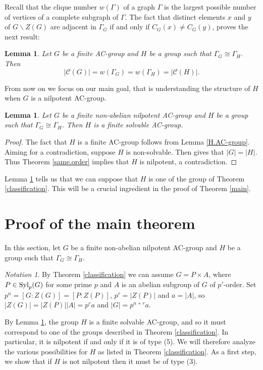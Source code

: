 \documentclass[12pt]{amsart}
\theoremstyle{definition}
\theoremstyle{remark}
\theoremstyle{plain}
\theoremstyle{plain}
\theoremstyle{plain}
\theoremstyle{plain}
\newtheorem{lemma}[definition]{Lemma}
\theoremstyle{plain}
\theoremstyle{remark}
\theoremstyle{remark}
\newtheorem{notation}[definition]{Notation}
\theoremstyle{definition}
\newcommand{\Syl}{\mathrm{Syl}}
\def \Syl {\hbox {\rm Syl}}
\begin{document}
Recall that the clique number $w(\Gamma)$ of a graph $\Gamma$ is the largest possible number of vertices of a complete subgraph of $\Gamma$. The fact that distinct elements $x$ and $y$ of $G \backslash Z(G)$ are adjacent in $\Gamma_G$ if and only if $C_G(x) \neq C_G(y)$, proves the next result:


\begin{lemma} Let $G$ be a finite AC-group and $H$ be a group such that $\Gamma_G \cong \Gamma_H$. Then
\[ |\mathcal{C}(G)| = w(\Gamma_G)=w(\Gamma_H)=|\mathcal{C}(H)|.\]
\end{lemma}

From now on we focus on our main goal, that is understanding the structure of $H$ when $G$ is a nilpotent AC-group.

\begin{lemma}\label{solvable}
Let $G$ be a finite non-abelian nilpotent AC-group and $H$ be a group such that $\Gamma_G \cong \Gamma_H$. Then $H$ is a finite solvable AC-group. 
\end{lemma}

\begin{proof}
The fact that $H$ is a finite AC-group follows from Lemma \ref{H.AC-group}.
Aiming for a contradiction, suppose $H$ is non-solvable. Then \cite[Proposition 3.14]{AAM} gives that $|G|=|H|$. Thus Theorem \ref{same.order} implies that $H$ is nilpotent, a contradiction.
\end{proof}

Lemma \ref{solvable} tells us that we can suppose that $H$ is one of the group of Theorem \ref{classification}. This will be a crucial ingredient in the proof of Theorem \ref{main}.


\section{Proof of the main theorem}
In this section, let $G$ be a finite non-abelian nilpotent AC-group and $H$ be a group such that $\Gamma_G \cong \Gamma_H$. 

\begin{notation}
By Theorem \ref{classification} we can assume $G = P \times A$, where $P \in \Syl_p(G)$ for some prime $p$ and $A$ is an abelian subgroup of $G$ of $p'$-order. Set $p^n = [G \colon Z(G)] = [P \colon Z(P)]$, $p^r = |Z(P)|$ and  $a = |A|$, so $|Z(G)| = |Z(P)||A| = p^ra$ and $|G| = p^{n+r}a$. 
\end{notation}

By Lemma \ref{solvable}, the group $H$ is a finite solvable AC-group, and so it must correspond to one of the groups described in Theorem \ref{classification}. In particular, it is nilpotent if and only if it is of type (5). 
We will therefore analyze the various possibilities for $H$ as listed in Theorem \ref{classification}. As a first step, we show that if $H$ is not nilpotent then it must be of type (3). 
\end{document}
